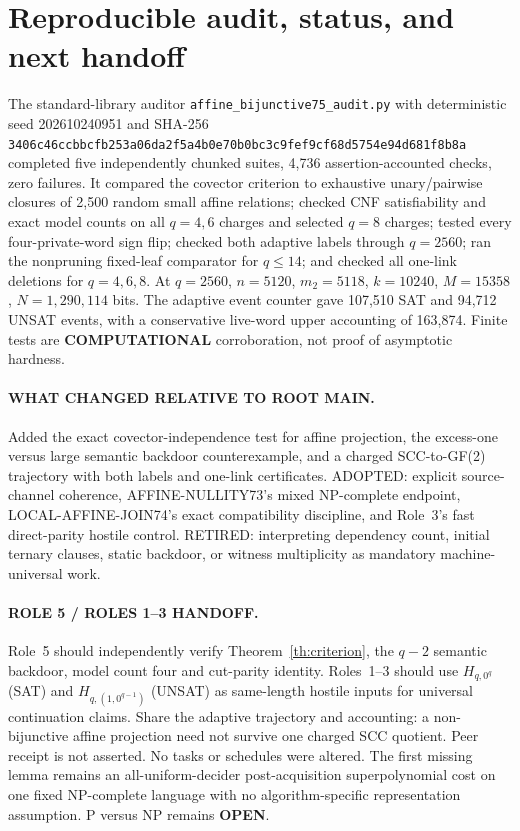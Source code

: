 \documentclass[11pt]{article}
\newcommand{\OPEN}{\textbf{OPEN}}
\begin{document}
\section{Reproducible audit, status, and next handoff}
The standard-library auditor \texttt{affine\_bijunctive75\_audit.py}
with deterministic seed 202610240951 and SHA-256
\texttt{3406c46ccbbcfb253a06da2f5a4b0e70b0bc3c9fef9cf68d5754e94d681f8b8a}
completed five independently chunked suites, 4,736
assertion-accounted checks, zero failures.
It compared the covector criterion to exhaustive unary/pairwise
closures of 2,500 random small affine relations; checked CNF
satisfiability and exact model counts on all $q=4,6$ charges
and selected $q=8$ charges; tested every four-private-word
sign flip; checked both adaptive labels through $q=2560$;
ran the nonpruning fixed-leaf comparator for $q\le14$;
and checked all one-link deletions for $q=4,6,8$.
At $q=2560$, $n=5120$, $m_2=5118$, $k=10240$,
$M=15358$, $N=1,290,114$ bits. The adaptive
event counter gave 107,510 SAT and 94,712 UNSAT events,
with a conservative live-word upper accounting of 163,874.
Finite tests are \textbf{COMPUTATIONAL} corroboration,
not proof of asymptotic hardness.

\paragraph{WHAT CHANGED RELATIVE TO ROOT MAIN.}
Added the exact covector-independence test for affine
projection, the excess-one versus large semantic
backdoor counterexample, and a charged SCC-to-GF(2)
trajectory with both labels and one-link certificates.
ADOPTED: explicit source-channel coherence,
AFFINE-NULLITY73's mixed NP-complete endpoint,
LOCAL-AFFINE-JOIN74's exact compatibility discipline,
and Role~3's fast direct-parity hostile control.
RETIRED: interpreting dependency count, initial
ternary clauses, static backdoor, or witness multiplicity
as mandatory machine-universal work.

\paragraph{ROLE 5 / ROLES 1--3 HANDOFF.}
Role~5 should independently verify Theorem~\ref{th:criterion},
the $q-2$ semantic backdoor, model count four and
cut-parity identity. Roles~1--3 should use
$H_{q,0^q}$ (SAT) and $H_{q,(1,0^{q-1})}$ (UNSAT)
as same-length hostile inputs for universal continuation
claims. Share the adaptive trajectory and accounting:
a non-bijunctive affine projection need not survive
one charged SCC quotient. Peer receipt is not asserted.
No tasks or schedules were altered.
The first missing lemma remains an all-uniform-decider
post-acquisition superpolynomial cost on one fixed
NP-complete language with no algorithm-specific representation
assumption. P versus NP remains \OPEN.
\end{document}
